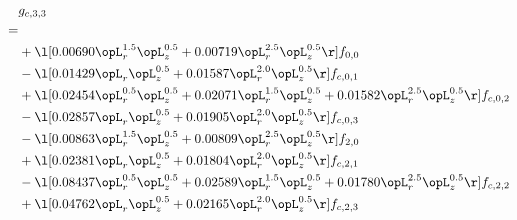 \begin{alignat}{2} 
\label{eq:g_33_0} 
& g_{c,3,3} \nonumber \\ 
 = \\ 
& + \l[  0.00690 \opL_r^{1.5} \opL_z^{0.5} +  0.00719 \opL_r^{2.5} \opL_z^{0.5}  \r] f_{0,0} \nonumber \\ 
& - \l[  0.01429 \opL_r \opL_z^{0.5} +  0.01587 \opL_r^{2.0} \opL_z^{0.5}  \r] f_{c,0,1} \nonumber \\ 
& + \l[  0.02454 \opL_r^{0.5} \opL_z^{0.5} +  0.02071 \opL_r^{1.5} \opL_z^{0.5} +  0.01582 \opL_r^{2.5} \opL_z^{0.5}  \r] f_{c,0,2} \nonumber \\ 
& - \l[  0.02857 \opL_r \opL_z^{0.5} +  0.01905 \opL_r^{2.0} \opL_z^{0.5}  \r] f_{c,0,3} \nonumber \\ 
& - \l[  0.00863 \opL_r^{1.5} \opL_z^{0.5} +  0.00809 \opL_r^{2.5} \opL_z^{0.5}  \r] f_{2,0} \nonumber \\ 
& + \l[  0.02381 \opL_r \opL_z^{0.5} +  0.01804 \opL_r^{2.0} \opL_z^{0.5}  \r] f_{c,2,1} \nonumber \\ 
& - \l[  0.08437 \opL_r^{0.5} \opL_z^{0.5} +  0.02589 \opL_r^{1.5} \opL_z^{0.5} +  0.01780 \opL_r^{2.5} \opL_z^{0.5}  \r] f_{c,2,2} \nonumber \\ 
& + \l[  0.04762 \opL_r \opL_z^{0.5} +  0.02165 \opL_r^{2.0} \opL_z^{0.5}  \r] f_{c,2,3} \nonumber \\ 
\end{alignat} 


